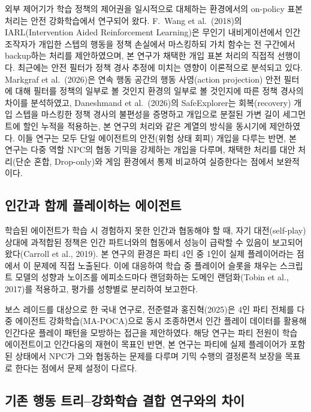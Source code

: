 \documentclass[12pt]{article}      %
\begin{document}
외부 제어기가 학습 정책의 제어권을 일시적으로 대체하는 환경에서의 on-policy 표본
처리는 안전 강화학습에서 연구되어 왔다. F.~Wang et al.\ (2018)의
IARL(Intervention Aided Reinforcement Learning)은 무인기 내비게이션에서 인간
조작자가 개입한 스텝의 행동을 정책 손실에서 마스킹하되 가치 함수는 전 구간에서
backup하는 처리를 제안하였으며, 본 연구가 채택한 개입 표본 처리의 직접적
선행이다. 최근에는 안전 필터가 정책 경사 추정에 미치는 영향이 이론적으로
분석되고 있다. Markgraf et al.\ (2026)은 연속 행동 공간의 행동 사영(action
projection) 안전 필터에 대해 필터를 정책의 일부로 볼 것인지 환경의 일부로 볼
것인지에 따른 정책 경사의 차이를 분석하였고, Daneshmand et al.\ (2026)의
SafeExplorer는 회복(recovery) 개입 스텝을 마스킹한 정책 경사의 불편성을 증명하고
개입으로 분절된 가변 길이 세그먼트에 할인 누적을 적용하는, 본 연구의 처리와 같은
계열의 방식을 동시기에 제안하였다. 이들 연구는 모두 단일 에이전트의 안전(위험
상태 회피) 개입을 다루는 반면, 본 연구는 다중 역할 NPC의 협동 기믹을 강제하는
개입을 다루며, 채택한 처리를 대안 처리(단순 혼합, Drop-only)와 게임 환경에서
통제 비교하여 실증한다는 점에서 보완적이다.

\subsection{인간과 함께 플레이하는 에이전트}

학습된 에이전트가 학습 시 경험하지 못한 인간과 협동해야 할 때, 자기 대전(self-play)
상대에 과적합된 정책은 인간 파트너와의 협동에서 성능이 급락할 수 있음이 보고되어
왔다(Carroll et al., 2019). 본 연구의 환경은 파티 4인 중 1인이 실제 플레이어라는
점에서 이 문제에 직접 노출된다. 이에 대응하여 학습 중 플레이어 슬롯을 채우는
스크립트 모델의 성향과 노이즈를 에피소드마다 랜덤화하는 도메인 랜덤화(Tobin et
al., 2017)를 적용하고, 평가를 성향별로 분리하여 보고한다.

보스 레이드를 대상으로 한 국내 연구로, 전준렬과 홍진혁(2025)은 4인 파티 전체를
다중 에이전트 강화학습(MA-POCA)으로 동시 조종하면서 인간 플레이 데이터를 활용해
인간다운 플레이 패턴을 모방하는 접근을 제안하였다. 해당 연구는 파티 전원이 학습
에이전트이고 인간다움의 재현이 목표인 반면, 본 연구는 파티에 실제 플레이어가
포함된 상태에서 NPC가 그와 협동하는 문제를 다루며 기믹 수행의 결정론적 보장을
목표로 한다는 점에서 문제 설정이 다르다.

\subsection{기존 행동 트리--강화학습 결합 연구와의 차이}
\end{document}

